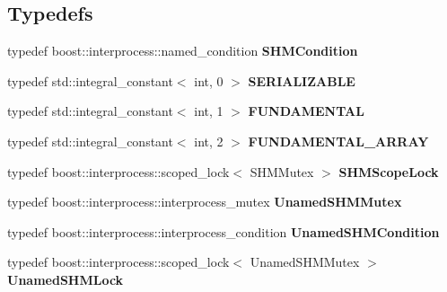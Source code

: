 \subsection*{Typedefs}
\begin{DoxyCompactItemize}
\item 
typedef boost\+::interprocess\+::named\+\_\+condition {\bfseries S\+H\+M\+Condition}\hypertarget{namespaceshared__memory_a98598a317e2364e30dec871c52491d3c}{}\label{namespaceshared__memory_a98598a317e2364e30dec871c52491d3c}

\item 
typedef std\+::integral\+\_\+constant$<$ int, 0 $>$ {\bfseries S\+E\+R\+I\+A\+L\+I\+Z\+A\+B\+LE}\hypertarget{namespaceshared__memory_af5f7fb7bbbc4c6334d59d0cd09f3ba85}{}\label{namespaceshared__memory_af5f7fb7bbbc4c6334d59d0cd09f3ba85}

\item 
typedef std\+::integral\+\_\+constant$<$ int, 1 $>$ {\bfseries F\+U\+N\+D\+A\+M\+E\+N\+T\+AL}\hypertarget{namespaceshared__memory_a391f1de569d6b76979d6ff4591513bfd}{}\label{namespaceshared__memory_a391f1de569d6b76979d6ff4591513bfd}

\item 
typedef std\+::integral\+\_\+constant$<$ int, 2 $>$ {\bfseries F\+U\+N\+D\+A\+M\+E\+N\+T\+A\+L\+\_\+\+A\+R\+R\+AY}\hypertarget{namespaceshared__memory_a641fa51f2069f15b1dfb114e630fc1ba}{}\label{namespaceshared__memory_a641fa51f2069f15b1dfb114e630fc1ba}

\item 
typedef boost\+::interprocess\+::scoped\+\_\+lock$<$ S\+H\+M\+Mutex $>$ {\bfseries S\+H\+M\+Scope\+Lock}\hypertarget{namespaceshared__memory_aa1e27e85804c1f1c0b7c1bf077add7bf}{}\label{namespaceshared__memory_aa1e27e85804c1f1c0b7c1bf077add7bf}

\item 
typedef boost\+::interprocess\+::interprocess\+\_\+mutex {\bfseries Unamed\+S\+H\+M\+Mutex}\hypertarget{namespaceshared__memory_a2a3aa667d92610e695d7948a834172f1}{}\label{namespaceshared__memory_a2a3aa667d92610e695d7948a834172f1}

\item 
typedef boost\+::interprocess\+::interprocess\+\_\+condition {\bfseries Unamed\+S\+H\+M\+Condition}\hypertarget{namespaceshared__memory_a83b64c7cfca3d52b46e5e9833968a7b9}{}\label{namespaceshared__memory_a83b64c7cfca3d52b46e5e9833968a7b9}

\item 
typedef boost\+::interprocess\+::scoped\+\_\+lock$<$ Unamed\+S\+H\+M\+Mutex $>$ {\bfseries Unamed\+S\+H\+M\+Lock}\hypertarget{namespaceshared__memory_a0b94121a6c0d65beda535a70704a1aa5}{}\label{namespaceshared__memory_a0b94121a6c0d65beda535a70704a1aa5}


\end{DoxyCompactItemize}
